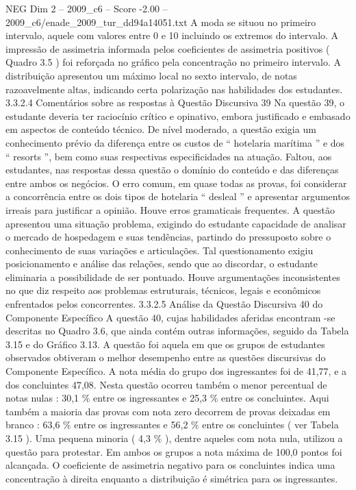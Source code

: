 \begin{textsample}{NEG Dim 2 – 2009\_c6 – Score -2.00 – 2009\_c6/enade\_2009\_tur\_dd94a14051.txt}
A moda se situou no primeiro intervalo, aquele com valores entre 0 e 10 incluindo os extremos do intervalo.
A impressão de assimetria informada pelos coeficientes de assimetria positivos ( Quadro 3.5 ) foi reforçada no gráfico pela concentração no primeiro intervalo.
A distribuição apresentou um máximo local no sexto intervalo, de notas razoavelmente altas, indicando certa polarização nas habilidades dos estudantes. 3.3.2.4 Comentários sobre as respostas à Questão Discursiva 39 Na questão 39, o estudante deveria ter raciocínio crítico e opinativo, embora justificado e embasado em aspectos de conteúdo técnico.
De nível moderado, a questão exigia um conhecimento prévio da diferença entre os custos de “ hotelaria marítima ” e dos “ resorts ”, bem como suas respectivas especificidades na atuação.
Faltou, aos estudantes, nas respostas dessa questão o domínio do conteúdo e das diferenças entre ambos os negócios.
O erro comum, em quase todas as provas, foi considerar a concorrência entre os dois tipos de hotelaria “ desleal ” e apresentar argumentos irreais para justificar a opinião.
Houve erros gramaticais frequentes.
A questão apresentou uma situação problema, exigindo do estudante capacidade de analisar o mercado de hospedagem e suas tendências, partindo do pressuposto sobre o conhecimento de suas variações e articulações.
Tal questionamento exigiu posicionamento e análise das relações, sendo que ao discordar, o estudante eliminaria a possibilidade de ser pontuado.
Houve argumentações inconsistentes no que diz respeito aos problemas estruturais, técnicos, legais e econômicos enfrentados pelos concorrentes. 3.3.2.5 Análise da Questão Discursiva 40 do Componente Específico A questão 40, cujas habilidades aferidas encontram -se descritas no Quadro 3.6, que ainda contém outras informações, seguido da Tabela 3.15 e do Gráfico 3.13.
A questão foi aquela em que os grupos de estudantes observados obtiveram o melhor desempenho entre as questões discursivas do Componente Específico.
A nota média do grupo dos ingressantes foi de 41,77, e a dos concluintes 47,08.
Nesta questão ocorreu também o menor percentual de notas nulas : 30,1 \% entre os ingressantes e 25,3 \% entre os concluintes.
Aqui também a maioria das provas com nota zero decorrem de provas deixadas em branco : 63,6 \% entre os ingressantes e 56,2 \% entre os concluintes ( ver Tabela 3.15 ).
Uma pequena minoria ( 4,3 \% ), dentre aqueles com nota nula, utilizou a questão para protestar.
Em ambos os grupos a nota máxima de 100,0 pontos foi alcançada.
O coeficiente de assimetria negativo para os concluintes indica uma concentração à direita enquanto a distribuição é simétrica para os ingressantes.

\end{textsample}
